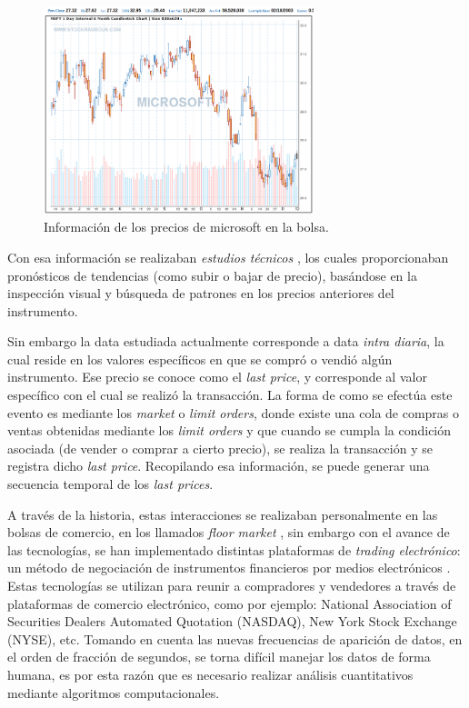 \begin{figure}[h!t]
    \begin{center}
        \includegraphics[width=0.7\textwidth]{images/microsoft}
        \caption{Información de los precios de microsoft en la bolsa.}
        \label{fig:microsoft}
    \end{center}
\end{figure}

Con esa información se realizaban \emph{estudios técnicos}
\cite{taylor1992use}, los cuales proporcionaban pronósticos de tendencias (como
subir o bajar de precio), basándose en la inspección visual y búsqueda de
patrones en los precios anteriores del instrumento. 

Sin embargo la data estudiada actualmente corresponde a data \emph{intra
diaria}, la cual reside en los valores específicos en que se compró o vendió
algún instrumento.  Ese precio se conoce como el \emph{last price}, y
corresponde al valor específico con el cual se realizó la transacción. La forma
de como se efectúa este evento es mediante los \emph{market} o \emph{limit
orders}, donde existe una cola de compras o ventas obtenidas mediante los
\emph{limit orders} y que cuando se cumpla la condición asociada (de vender o
comprar a cierto precio), se realiza la transacción y se registra dicho
\emph{last price}. Recopilando esa información, se puede generar una secuencia
temporal de los \emph{last prices}. 

A través de la historia, estas interacciones se realizaban personalmente en las
bolsas de comercio, en los llamados \emph{floor market}
\cite{jain2005financial}, sin embargo con el avance de las tecnologías, se han
implementado distintas plataformas de \emph{trading electrónico}: un método de
negociación de instrumentos financieros por medios electrónicos
\cite{weston2002electronic}. Estas tecnologías se utilizan para reunir a
compradores y vendedores a través de plataformas de comercio electrónico, como
por ejemplo: National Association of Securities Dealers Automated Quotation
(NASDAQ), New York Stock Exchange (NYSE), etc. Tomando en cuenta las nuevas
frecuencias de aparición de datos, en el orden de fracción de segundos, se
torna difícil manejar los datos de forma humana, es por esta razón que es
necesario realizar análisis cuantitativos mediante algoritmos computacionales.

